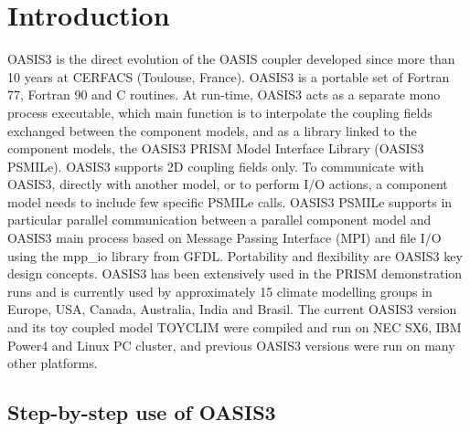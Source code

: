 \newpage
\chapter{Introduction}
\label{sec_step}

OASIS3 is the direct evolution of the OASIS coupler developed since
more than 10 years at CERFACS (Toulouse, France).  OASIS3 is a
portable set of Fortran 77, Fortran 90 and C routines.  At run-time,
OASIS3 acts as a separate mono process executable, which main function
is to interpolate the coupling fields exchanged between the component
models, and as a library linked to the component models, the OASIS3
PRISM Model Interface Library (OASIS3 PSMILe). OASIS3 supports 2D
coupling fields only. To communicate with OASIS3, directly with
another model, or to perform I/O actions, a component model needs to
include few specific PSMILe calls. OASIS3 PSMILe supports in
particular parallel communication between a parallel component model
and OASIS3 main process based on Message Passing Interface (MPI) and
file I/O using the mpp\_io library from GFDL.  Portability and
flexibility are OASIS3 key design concepts.  OASIS3 has been
extensively used in the PRISM demonstration runs and is currently used
by approximately 15 climate modelling groups in Europe, USA, Canada,
Australia, India and Brasil.  The current OASIS3 version and its toy
coupled model TOYCLIM were compiled and run on NEC SX6,
IBM Power4 and Linux PC cluster, and previous OASIS3 versions were run
on many other platforms.

\section{Step-by-step use of OASIS3}


